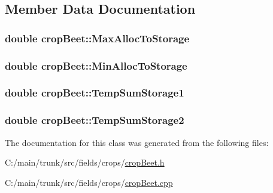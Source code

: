 \subsection{Member Data Documentation}
\hypertarget{classcrop_beet_abd20ec5c02e4df61d3c93f1074b15aa6}{
\subsubsection[{MaxAllocToStorage}]{\setlength{\rightskip}{0pt plus 5cm}double {\bf cropBeet::MaxAllocToStorage}}}
\label{classcrop_beet_abd20ec5c02e4df61d3c93f1074b15aa6}
\hypertarget{classcrop_beet_abfa5200bf40932d06448e7a6a678de83}{
\subsubsection[{MinAllocToStorage}]{\setlength{\rightskip}{0pt plus 5cm}double {\bf cropBeet::MinAllocToStorage}}}
\label{classcrop_beet_abfa5200bf40932d06448e7a6a678de83}
\hypertarget{classcrop_beet_afb7dd14e41f2e9f9a74db2d474f94808}{
\subsubsection[{TempSumStorage1}]{\setlength{\rightskip}{0pt plus 5cm}double {\bf cropBeet::TempSumStorage1}}}
\label{classcrop_beet_afb7dd14e41f2e9f9a74db2d474f94808}
\hypertarget{classcrop_beet_ae4bed6a17efc19a31cca20121d0b5f44}{
\subsubsection[{TempSumStorage2}]{\setlength{\rightskip}{0pt plus 5cm}double {\bf cropBeet::TempSumStorage2}}}
\label{classcrop_beet_ae4bed6a17efc19a31cca20121d0b5f44}


The documentation for this class was generated from the following files:\begin{DoxyCompactItemize}
\item 
C:/main/trunk/src/fields/crops/\hyperlink{crop_beet_8h}{cropBeet.h}\item 
C:/main/trunk/src/fields/crops/\hyperlink{crop_beet_8cpp}{cropBeet.cpp}\end{DoxyCompactItemize}
